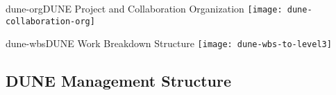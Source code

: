 \begin{cdrfigure}{dune-org}{DUNE Project and Collaboration Organization}
  \texttt{[image: dune-collaboration-org]}
\end{cdrfigure}

\begin{cdrfigure}{dune-wbs}{DUNE Work Breakdown Structure}
  \texttt{[image: dune-wbs-to-level3]}
\end{cdrfigure}

\subsection{DUNE Management Structure}

